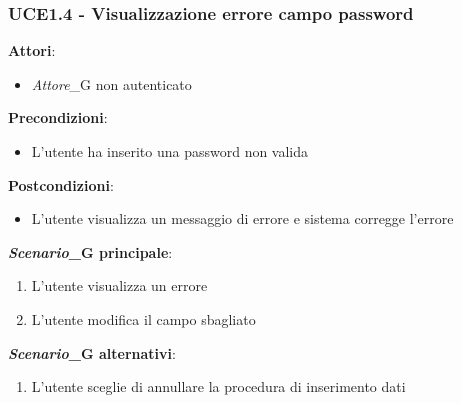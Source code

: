\subsubsection{UCE1.4 - Visualizzazione errore campo password}
\textbf{Attori}:
\begin{itemize}
    \item \textit{Attore}_G non autenticato
\end{itemize}
\textbf{Precondizioni}:
\begin{itemize}
    \item L'utente ha inserito una password non valida
\end{itemize}
\textbf{Postcondizioni}:
\begin{itemize}
    \item L'utente visualizza un messaggio di errore e sistema corregge l'errore
\end{itemize}
\textbf{\textit{Scenario}_G principale}:
\begin{enumerate}
    \item L'utente visualizza un errore 
    \item L'utente modifica il campo sbagliato
\end{enumerate}
\textbf{\textit{Scenario}_G alternativi}:
\begin{enumerate}
    \item L'utente sceglie di annullare la procedura di inserimento dati
\end{enumerate}